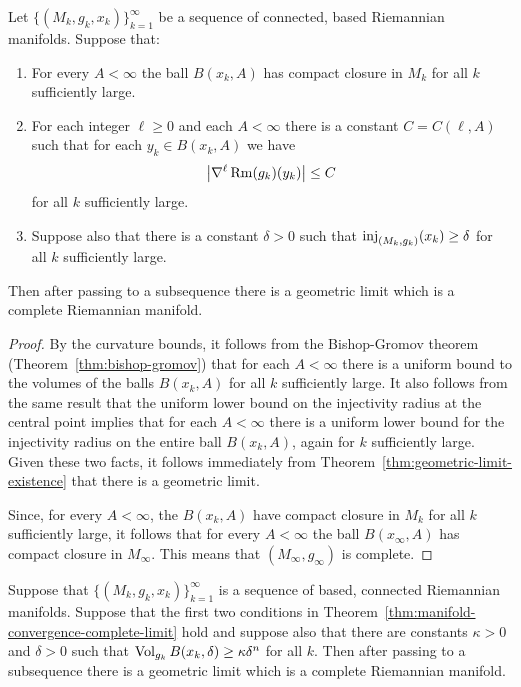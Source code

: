\begin{theorem}\label{thm:manifold-convergence-complete-limit}

\label{mfdconv}

Let $\{(M_k,g_k,x_k)\}_{k=1}^\infty$ be a sequence  of connected,
based Riemannian manifolds. Suppose that:
\begin{enumerate}
\item[(1)] For every $A<\infty$ the ball
$B(x_k,A)$ has compact closure in $M_k$ for all $k$ sufficiently
large.
\item[(2)] For each integer $\ell\ge 0$ and each $A<\infty$ there is a constant
$C=C(\ell,A)$ such that for each $y_k\in B(x_k,A)$ we have
$$\left|\nabla^\ell\operatorname{Rm}(g_k)(y_k)\right|\le C$$
for all $k$ sufficiently large.
\item[(3)] Suppose also that there is a constant $\delta>0$ such that $\operatorname{inj}_{(M_k,g_k)}(x_k)\ge \delta$ for all $k$ sufficiently large.
\end{enumerate}
 Then after passing to a subsequence there is a geometric limit which
 is a complete Riemannian manifold.
\end{theorem}

\begin{proof}
\sketch
{}
By the curvature bounds, it follows from the Bishop-Gromov theorem
(Theorem~\ref{thm:bishop-gromov}) that for each $A<\infty$ there is a uniform bound
to the volumes of the balls $B(x_k,A)$ for all $k$ sufficiently large. It also
follows from the same result that  the uniform lower bound on the injectivity
radius at the central point implies that for each $A<\infty$ there is a uniform
lower bound for the injectivity radius on the entire ball $B(x_k,A)$, again for
$k$ sufficiently large. Given these two facts, it follows immediately from
Theorem~\ref{thm:geometric-limit-existence} that there is a geometric limit.

Since, for every $A<\infty$, the $B(x_k,A)$ have compact closure in
$M_k$ for all $k$ sufficiently large, it follows that for every
$A<\infty$ the ball $B(x_\infty,A)$ has compact closure in
$M_\infty$. This means that $(M_\infty,g_\infty)$ is complete.
\end{proof}

\begin{corollary}\label{cor:manifold-convergence-volume-noncollapsed}

\label{2ndmfdconv}

Suppose that $\{(M_k,g_k,x_k)\}_{k=1}^\infty$ is a sequence of based, connected
Riemannian manifolds. Suppose that the first two conditions in
Theorem~\ref{thm:manifold-convergence-complete-limit} hold and suppose also that there are constants $\kappa>0$
and $\delta>0$ such that $\operatorname{Vol}_{g_k}B(x_k,\delta)\ge \kappa\delta^n$ for
all $k$. Then after passing to a subsequence there is a geometric limit which
is a complete Riemannian manifold.
\end{corollary}

